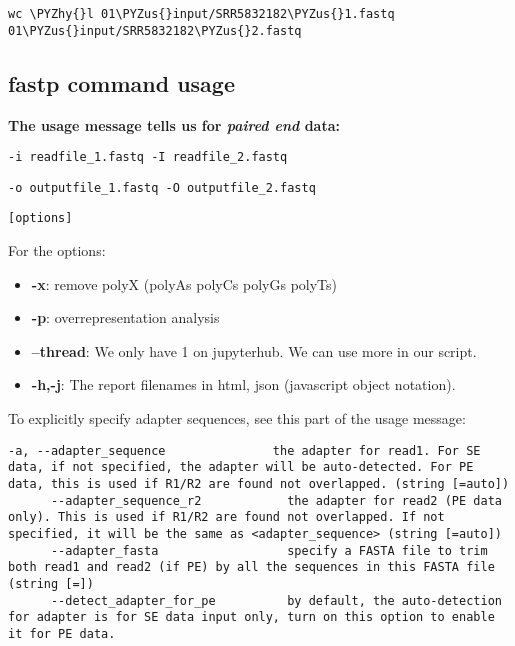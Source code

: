 \documentclass[11pt]{article}
\makeatletter
\providecommand{\tightlist}{%
      \setlength{\itemsep}{0pt}\setlength{\parskip}{0pt}}
\def\PYZus{\char`\_}
\def\PYZhy{\char`\-}
\newcommand{\boxspacing}{\kern\kvtcb@left@rule\kern\kvtcb@boxsep}
\newcommand{\prompt}[4]{
        \ttfamily\llap{{\color{#2}[#3]:\hspace{3pt}#4}}\vspace{-\baselineskip}
    }
\makeatother
\begin{document}
    \begin{tcolorbox}[breakable, size=fbox, boxrule=1pt, pad at break*=1mm,colback=cellbackground, colframe=cellborder]
\prompt{In}{incolor}{ }{\boxspacing}
\begin{Verbatim}[commandchars=\\\{\}]
wc \PYZhy{}l 01\PYZus{}input/SRR5832182\PYZus{}1.fastq 01\PYZus{}input/SRR5832182\PYZus{}2.fastq
\end{Verbatim}
\end{tcolorbox}

    \hypertarget{fastp-command-usage}{%
\subsection{fastp command usage}\label{fastp-command-usage}}

\textbf{The usage message tells us for \emph{paired end} data:}

\texttt{-i\ readfile\_1.fastq\ -I\ readfile\_2.fastq}

\texttt{-o\ outputfile\_1.fastq\ -O\ outputfile\_2.fastq}

\texttt{{[}options{]}}

For the options:

\begin{itemize}
\tightlist
\item
  \textbf{-x}: remove polyX (polyAs polyCs polyGs polyTs)
\item
  \textbf{-p}: overrepresentation analysis
\item
  \textbf{--thread}: We only have 1 on jupyterhub. We can use more in
  our script.
\item
  \textbf{-h,-j}: The report filenames in html, json (javascript object
  notation).
\end{itemize}

To explicitly specify adapter sequences, see this part of the usage
message:

\begin{verbatim}
-a, --adapter_sequence               the adapter for read1. For SE data, if not specified, the adapter will be auto-detected. For PE data, this is used if R1/R2 are found not overlapped. (string [=auto])
      --adapter_sequence_r2            the adapter for read2 (PE data only). This is used if R1/R2 are found not overlapped. If not specified, it will be the same as <adapter_sequence> (string [=auto])
      --adapter_fasta                  specify a FASTA file to trim both read1 and read2 (if PE) by all the sequences in this FASTA file (string [=])
      --detect_adapter_for_pe          by default, the auto-detection for adapter is for SE data input only, turn on this option to enable it for PE data.
\end{verbatim}
\end{document}
